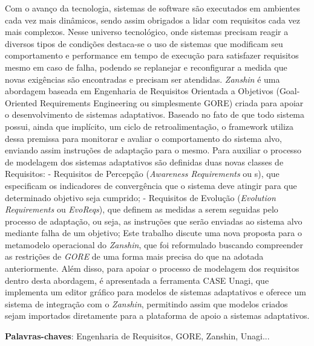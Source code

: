 \documentclass[
	12pt,				%
	openright,			%
	oneside,
	a4paper,			%
	english,			%
	french,				%
	spanish,			%
	brazil				%
	]{abntex2}
\newcommand{\evoreqs}{\textit{EvoReqs}\xspace}
\newcommand{\gore}{\textit{GORE}\xspace}
\newcommand{\zanshin}{\textit{Zanshin}\xspace}
\begin{document}
\setlength{\absparsep}{18pt}
\begin{resumo}

Com o avanço da tecnologia, sistemas de software são executados em ambientes cada vez mais dinâmicos, sendo assim obrigados a lidar com requisitos cada vez mais complexos. Nesse universo tecnológico, onde sistemas precisam reagir a diversos tipos de condições destaca-se o uso de sistemas que modificam seu comportamento e performance em tempo de execução para satisfazer requisitos mesmo em caso de falha, podendo se replanejar e reconfigurar a medida que novas exigências são encontradas e precisam ser atendidas.
\zanshin é uma abordagem baseada em Engenharia de Requisitos Orientada a Objetivos (Goal-Oriented Requirements Engineering ou simplesmente GORE) criada para apoiar o desenvolvimento de sistemas adaptativos. Baseado no fato de que todo sistema possui, ainda que implícito, um ciclo de retroalimentação, o framework utiliza dessa premissa para monitorar e avaliar o comportamento do sistema alvo, enviando assim instruções de adaptação para o mesmo. Para auxiliar o processo de modelagem dos sistemas adaptativos são definidas duas novas classes de Requisitos:
- Requisitos de Percepção (\textit{Awareness Requirements} ou s), que especificam os indicadores de convergência que o sistema deve atingir para que determinado objetivo seja cumprido;
- Requisitos de Evolução (\textit{Evolution Requirements} ou \evoreqs), que definem as medidas a serem seguidas pelo processo de adaptação, ou seja, as instruções que serão enviadas ao sistema alvo mediante falha de um objetivo;
Este trabalho discute uma nova proposta para o metamodelo operacional do \zanshin, que foi reformulado buscando compreender as restrições de \gore de uma forma mais precisa do que na adotada anteriormente.
Além disso, para apoiar o processo de modelagem dos requisitos dentro desta abordagem, é apresentada a ferramenta CASE Unagi, que implementa um editor gráfico para modelos de sistemas adaptativos e oferece um sistema de integração com o \zanshin, permitindo assim que modelos criados sejam importados diretamente para a plataforma de apoio a sistemas adaptativos.



\textbf{Palavras-chaves}:  Engenharia de Requisitos, GORE, Zanshin, Unagi...
\end{resumo}
\end{document}

